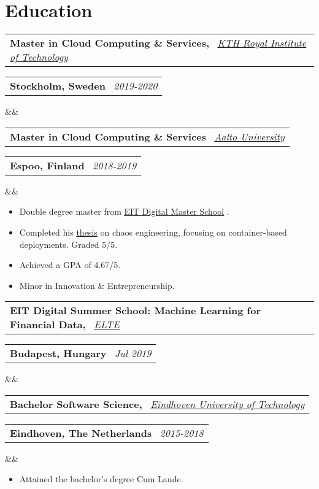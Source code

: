 \documentclass[11pt,a4paper,sans]{moderncv}
\makeatletter
\newcommand*{\customcventry}[7][.13em]{
\begin{tabular}{@{}l}
{\bfseries #4} \
{\itshape #3}
\end{tabular}
\hfill
\begin{tabular}{l@{}}
{\bfseries #5} \
{\itshape #2}
\end{tabular}
\ifx&#7&%
\else{\
\begin{minipage}{\maincolumnwidth}%
\small#7%
\end{minipage}}\fi%
\par\addvspace{#1}}
\newcommand{\inlineLink}[2]{%
    \underline{\href{#1}{#2}}%
}
\makeatother
\begin{document}
\section{Education}

\customcventry
    {2019-2020}
    {\color{blue}\href{https://kth.se/en}{KTH Royal Institute of Technology}}
    {Master in Cloud Computing \& Services,}
    {Stockholm, Sweden}
    {}{}{} %
\customcventry{2018-2019}{\color{blue}\href{https://www.aalto.fi/en}{Aalto University}}
{\color{white}Master in Cloud Computing \& Services}
{Espoo, Finland}{}{}
{
    \begin{itemize}[leftmargin=0.6cm, label={\textbullet}]
        \item Double degree master from \inlineLink{https://eit.europa.eu/our-activities/opportunities/eit-digital-master-school}{EIT Digital Master School}.
        \item Completed his \inlineLink{https://urn.kb.se/resolve?urn=urn:nbn:se:kth:diva-291281}{thesis} on chaos engineering, focusing on container-based deployments. Graded 5/5.
        \item Achieved a GPA of 4.67/5.
        \item Minor in Innovation \& Entrepreneurship.
    \end{itemize}
}

\customcventry
    {Jul 2019}
    {\color{blue}\href{https://www.elte.hu/en/}{ELTE}}
    {EIT Digital Summer School: Machine Learning for Financial Data,}
    {Budapest, Hungary}
    {}{}
    {
        \begin{itemize}[leftmargin=0.6cm, label={\textbullet}]
        \end{itemize}
    }

\customcventry
    {2015-2018}
    {\color{blue}\href{https://tue.nl/}{Eindhoven University of Technology}}
    {Bachelor Software Science,}
    {Eindhoven, The Netherlands}{}{}
    {
        \begin{itemize}[leftmargin=0.6cm, label={\textbullet}]
            \item Attained the bachelor's degree Cum Laude. 
        \end{itemize}
    }
\end{document}
